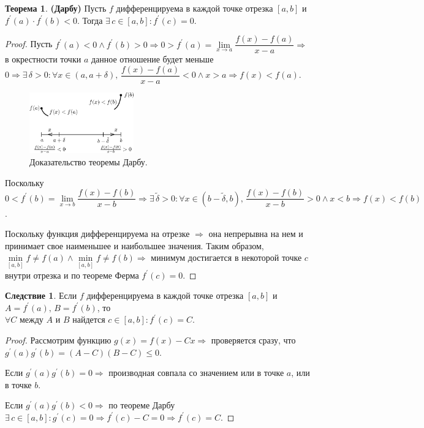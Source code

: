 \documentclass[12pt]{article}
\theoremstyle{definition}
\newtheorem{theorem}{Теорема}
\newtheorem{corollary}{Следствие}
\begin{document}
\begin{theorem}\textbf{(Дарбу)}
	Пусть $f$ дифференцируема в каждой точке отрезка $[a,b]$ и $f^\prime(a){\cdot}f^\prime(b) < 0$. Тогда $\exists \, c \in [a,b] \colon f^\prime(c) = 0$.
\end{theorem}
\begin{proof}
	Пусть $f^\prime(a) < 0 \wedge f^\prime(b)>0 \Rightarrow 0 > f^\prime(a) = \lim\limits_{x \to a}\dfrac{f(x) - f(a)}{x - a} \Rightarrow$ в окрестности точки $a$ данное отношение будет меньше $0 \Rightarrow \exists \, \delta > 0 \colon \forall x \in (a, a + \delta), \, \dfrac{f(x) - f(a)}{x-a} < 0 \wedge x > a \Rightarrow f(x) < f(a)$.
	\begin{figure}[H]
		\centering
		\includegraphics[width=0.4\textwidth]{26_2.eps}
		\caption{Доказательство теоремы Дарбу.}
		\label{26_2}
	\end{figure}
	Поскольку $0 < f^\prime(b) = \lim\limits_{x \to b}\dfrac{f(x) - f(b)}{x - b} \Rightarrow \exists \, \tilde{\delta} > 0 \colon \forall x \in (b -\tilde{\delta}, b), \, \dfrac{f(x) - f(b)}{x-b} > 0 \wedge x < b \Rightarrow f(x) < f(b)$.
	
	Поскольку функция дифференцируема на отрезке $\Rightarrow$ она непрерывна на нем и принимает свое наименьшее и наибольшее значения. Таким образом, $\min\limits_{[a,b]}f \neq f(a) \wedge \min\limits_{[a,b]}f \neq f(b) \Rightarrow$  минимум достигается в некоторой точке $c$ внутри отрезка и по теореме Ферма $f^\prime(c) = 0$.
\end{proof}

\begin{corollary}
	Если $f$ дифференцируема в каждой точке отрезка $[a,b]$ и $A = f^\prime(a), \, B = f^\prime(b)$, то \\
	$\forall C$ между $A$ и $B$ найдется $c \in [a,b] \colon f^\prime(c) = C$.
\end{corollary}
 
\begin{proof}
	Рассмотрим функцию $g(x) = f(x) - Cx \Rightarrow$ проверяется сразу, что $g^\prime(a)g^\prime(b) = (A-C)(B-C) \leq 0$.
	
	Если $g^\prime(a)g^\prime(b) = 0 \Rightarrow$ производная совпала со значением или в точке $a$, или в точке $b$.
	
	Если $g^\prime(a)g^\prime(b) < 0 \Rightarrow$ по теореме Дарбу $\exists \, c \in [a,b] \colon g^\prime(c) = 0 \Rightarrow f^\prime(c) - C = 0 \Rightarrow f^\prime(c) = C$.
\end{proof}
\end{document}
